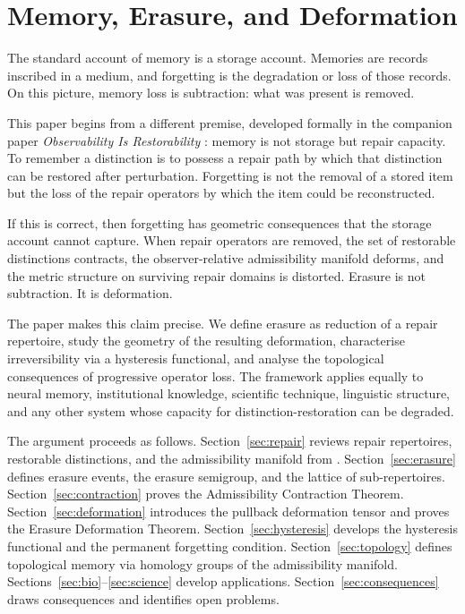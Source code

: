 \documentclass[12pt, oneside]{article}
\theoremstyle{plain}
\theoremstyle{definition}
\theoremstyle{remark}
\begin{document}
\section{Memory, Erasure, and Deformation}
\label{sec:intro}

The standard account of memory is a storage account.
Memories are records inscribed in a medium, and forgetting is the
degradation or loss of those records.
On this picture, memory loss is subtraction: what was present is
removed.

This paper begins from a different premise, developed formally in
the companion paper \emph{Observability Is Restorability}
\cite{Flyxion2026a}: memory is not storage but repair capacity.
To remember a distinction is to possess a repair path by which that
distinction can be restored after perturbation.
Forgetting is not the removal of a stored item but the loss of the
repair operators by which the item could be reconstructed.

If this is correct, then forgetting has geometric consequences that
the storage account cannot capture.
When repair operators are removed, the set of restorable distinctions
contracts, the observer-relative admissibility manifold deforms, and
the metric structure on surviving repair domains is distorted.
Erasure is not subtraction.
It is deformation.

The paper makes this claim precise.
We define erasure as reduction of a repair repertoire, study the
geometry of the resulting deformation, characterise irreversibility
via a hysteresis functional, and analyse the topological consequences
of progressive operator loss.
The framework applies equally to neural memory, institutional
knowledge, scientific technique, linguistic structure, and any other
system whose capacity for distinction-restoration can be degraded.

The argument proceeds as follows.
Section~\ref{sec:repair} reviews repair repertoires, restorable
distinctions, and the admissibility manifold from
\cite{Flyxion2026a}.
Section~\ref{sec:erasure} defines erasure events, the erasure
semigroup, and the lattice of sub-repertoires.
Section~\ref{sec:contraction} proves the Admissibility Contraction
Theorem.
Section~\ref{sec:deformation} introduces the pullback deformation
tensor and proves the Erasure Deformation Theorem.
Section~\ref{sec:hysteresis} develops the hysteresis functional and
the permanent forgetting condition.
Section~\ref{sec:topology} defines topological memory via homology
groups of the admissibility manifold.
Sections~\ref{sec:bio}--\ref{sec:science} develop applications.
Section~\ref{sec:consequences} draws consequences and identifies open
problems.
\end{document}
